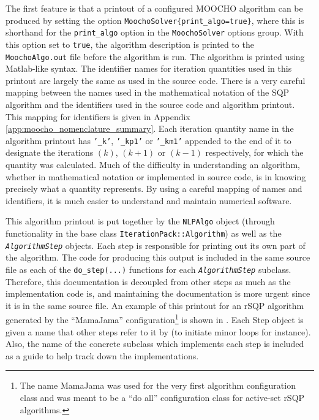 \documentclass[pdf,12pt,report]{SANDreport}
\begin{document}
The first feature is that a printout of a configured MOOCHO algorithm can be
produced by setting the option
{}\texttt{Moocho\-Solver\{\-print\-\_algo\-=true\-\}}, where this is shorthand
for the {}\texttt{print\-\_algo} option in the {}\texttt{Moocho\-Solver}
options group.  With this option set to {}\texttt{true}, the algorithm
description is printed to the {}\texttt{MoochoAlgo.out} file before the
algorithm is run.  The algorithm is printed using Matlab-like syntax.  The
identifier names for iteration quantities used in this printout are largely
the same as used in the source code.  There is a very careful mapping between
the names used in the mathematical notation of the SQP algorithm and the
identifiers used in the source code and algorithm printout.  This mapping for
identifiers is given in Appendix {}\ref{app:moocho_nomenclature_summary}.
Each iteration quantity name in the algorithm printout has {}\texttt{'\_k'},
{}\texttt{'\_kp1'} or {}\texttt{'\_km1'} appended to the end of it to
designate the iterations $(k)$, $(k+1)$ or $(k-1)$ respectively, for which the
quantity was calculated.  Much of the difficulty in understanding an
algorithm, whether in mathematical notation or implemented in source code, is
in knowing precisely what a quantity represents.  By using a careful mapping
of names and identifiers, it is much easier to understand and maintain
numerical software.

This algorithm printout is put together by the {}\texttt{NLP\-Algo} object
(through functionality in the base class
{}\texttt{Iteration\-Pack\-::Algorithm}) as well as the
{}\textit{\texttt{Algorithm\-Step}} objects.  Each step is responsible for
printing out its own part of the algorithm.  The code for producing this
output is included in the same source file as each of the
{}\texttt{do\_step(...)}  functions for each {}\textit{\texttt{AlgorithmStep}}
subclass.  Therefore, this documentation is decoupled from other steps as much
as the implementation code is, and maintaining the documentation is more
urgent since it is in the same source file.  An example of this printout for
an rSQP algorithm generated by the ``MamaJama'' configuration\footnote{The
name MamaJama was used for the very first algorithm configuration class and
was meant to be a ``do all'' configuration class for active-set rSQP
algorithms.} is shown in {}\cite{ref:moochorefguide}.  Each Step object is
given a name that other steps refer to it by (to initiate minor loops for
instance).  Also, the name of the concrete subclass which implements each step
is included as a guide to help track down the implementations.
\end{document}
